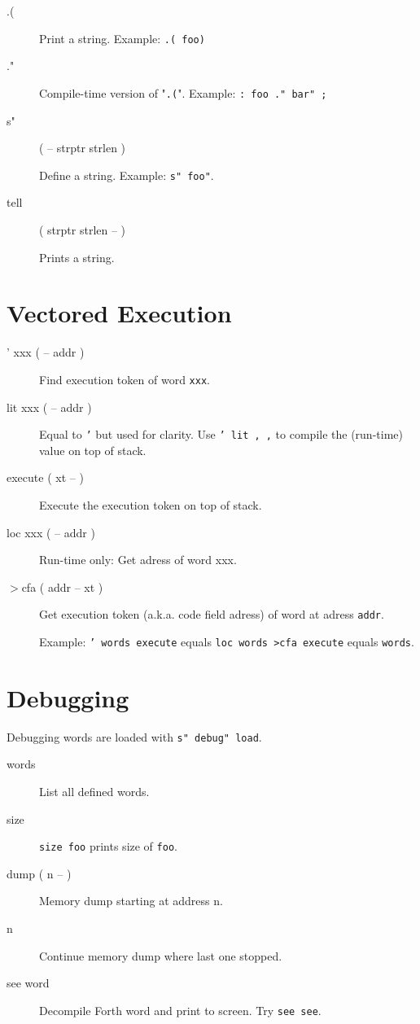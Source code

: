 \begin{description}
\item[.(]

Print a string. Example: \texttt{.( foo)}

\item[."]

Compile-time version of "\texttt{.(}". Example: \texttt{: foo ." bar" ;}

\item[s"] ( -- strptr strlen )

Define a string. Example: \texttt{s" foo"}. 

\item[tell] ( strptr strlen -- )

Prints a string.

\end{description}

\section{Vectored Execution}

\begin{description}
\item[' xxx ( -- addr )] Find execution token of word \texttt{xxx}.
\item[lit xxx ( -- addr )] Equal to \texttt{'} but used for clarity. Use \texttt{' lit , ,} to compile the (run-time) value on top of stack.
\item[execute ( xt -- )] Execute the execution token on top of stack.
\item[loc xxx ( -- addr )] Run-time only: Get adress of word xxx.
\item[$>$cfa ( addr -- xt )] Get execution token (a.k.a. code field adress) of word at adress \texttt{addr}.

Example: \texttt{' words execute} equals \texttt{loc words >cfa execute} equals \texttt{words}.
\end{description}


\section{Debugging}

Debugging words are loaded with \texttt{s" debug" load}.

\begin{description}
\item[words] List all defined words.
\item[size] \texttt{size foo} prints size of \texttt{foo}.
\item[dump ( n -- )] Memory dump starting at address n.
\item[n] Continue memory dump where last one stopped.
\item[see word] Decompile Forth word and print to screen. Try \texttt{see see}.
\end{description}

